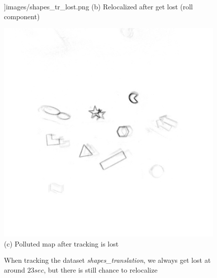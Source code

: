 \begin{enumerate}
\begin{figure}
\begin{minipage}[t]{0.48\textwidth}
      \textwidth]{images/shapes_tr_lost.png} (b) Relocalized after get
      lost (roll component)
    \end{minipage}

   \begin{minipage}[t]{0.48\textwidth}
     \centering \includegraphics[width =
     \textwidth]{images/map_956.jpg} (c) Polluted map after tracking
     is lost
   \end{minipage} \caption{When tracking the dataset
     \textit{shapes\_translation}, we always get lost at around
     $23 sec$, but there is still chance to relocalize}
   \label{fig:shapes_tr_lost}
 \end{figure}

\end{enumerate}

